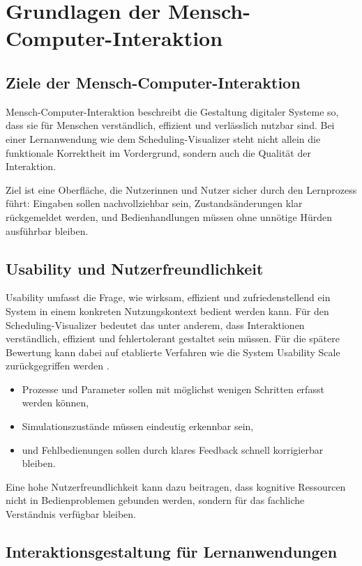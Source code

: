 \chapter{Grundlagen der Mensch-Computer-Interaktion}

\section{Ziele der Mensch-Computer-Interaktion}

Mensch-Computer-Interaktion beschreibt die Gestaltung digitaler Systeme so, dass sie für Menschen verständlich, effizient und verlässlich nutzbar sind. Bei einer Lernanwendung wie dem Scheduling-Visualizer steht nicht allein die funktionale Korrektheit im Vordergrund, sondern auch die Qualität der Interaktion.

Ziel ist eine Oberfläche, die Nutzerinnen und Nutzer sicher durch den Lernprozess führt: Eingaben sollen nachvollziehbar sein, Zustandsänderungen klar rückgemeldet werden, und Bedienhandlungen müssen ohne unnötige Hürden ausführbar bleiben.

\section{Usability und Nutzerfreundlichkeit}

Usability umfasst die Frage, wie wirksam, effizient und zufriedenstellend ein System in einem konkreten Nutzungskontext bedient werden kann. Für den Scheduling-Visualizer bedeutet das unter anderem, dass Interaktionen verständlich, effizient und fehlertolerant gestaltet sein müssen. Für die spätere Bewertung kann dabei auf etablierte Verfahren wie die System Usability Scale zurückgegriffen werden \cite{brooke1996sus}.

\begin{itemize}
    \item Prozesse und Parameter sollen mit möglichst wenigen Schritten erfasst werden können,
    \item Simulationszustände müssen eindeutig erkennbar sein,
    \item und Fehlbedienungen sollen durch klares Feedback schnell korrigierbar bleiben.
\end{itemize}

Eine hohe Nutzerfreundlichkeit kann dazu beitragen, dass kognitive Ressourcen nicht in Bedienproblemen gebunden werden, sondern für das fachliche Verständnis verfügbar bleiben.

\section{Interaktionsgestaltung für Lernanwendungen}

